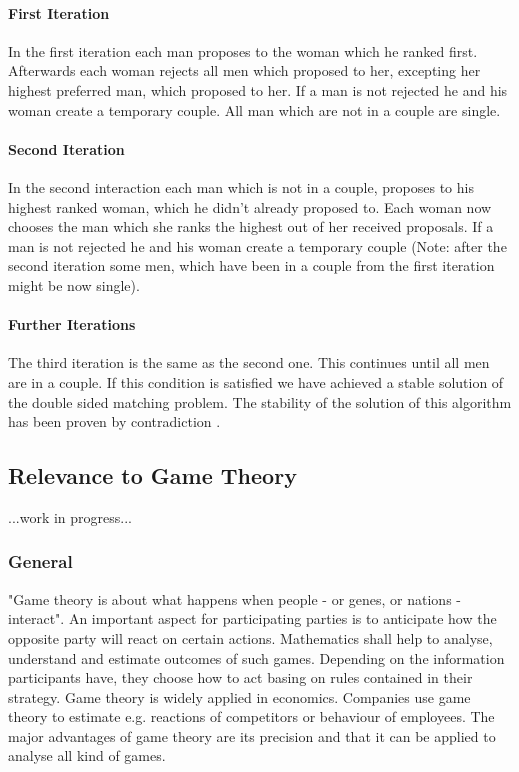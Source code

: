 \paragraph{First Iteration\\}
In the first iteration each man proposes to the woman which he ranked first.
Afterwards each woman rejects all men which proposed to her, excepting her highest preferred man, which proposed to her.
If a man is not rejected he and his woman create a temporary couple.
All man which are not in a couple are single.

\paragraph{Second Iteration\\}
In the second interaction each man which is not in a couple, proposes to his highest ranked woman, which he didn't already proposed to.
Each woman now chooses the man which she ranks the highest out of her received proposals.
If a man is not rejected he and his woman create a temporary couple (Note: after the second iteration some men, which have been in a couple from the first iteration might be now single).

\paragraph{Further Iterations\\}
The third iteration is the same as the second one.
This continues until all men are in a couple.
If this condition is satisfied we have achieved a stable solution of the double sided matching problem.
The stability of the solution of this algorithm has been proven by contradiction \cite{gale62a}.

\subsection{Relevance to Game Theory}
...work in progress...

\subsubsection{General}
"Game theory is about what happens when people - or genes, or nations - interact".
An important aspect for participating parties is to anticipate how the opposite party will react on certain actions.
Mathematics shall help to analyse, understand and estimate outcomes of such games. Depending on the information participants have, they choose how to act basing on rules contained in their strategy.
Game theory is widely applied in economics.
Companies use game theory to estimate e.g. reactions of competitors or behaviour of employees.
The major advantages of game theory are its precision and that it can be applied to analyse all kind of games. \cite[p. 1ff]{camerer2003behavioral}

